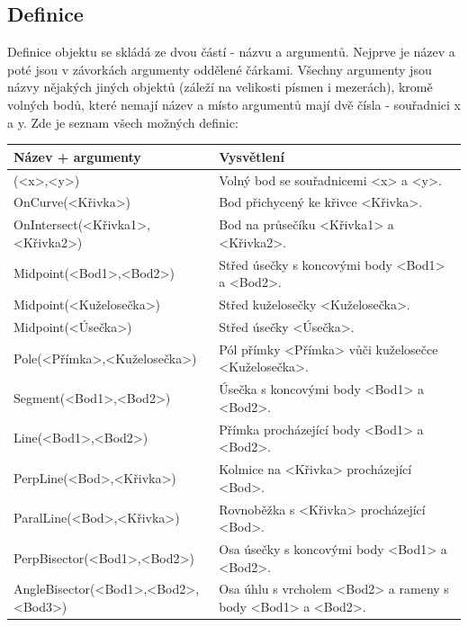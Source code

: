 \documentclass[11pt]{article}
\begin{document}
    \subsection{Definice}
    Definice objektu se skládá ze dvou částí - názvu a argumentů. Nejprve je název a poté jsou v závorkách argumenty oddělené čárkami. Všechny argumenty jsou názvy nějakých jiných objektů (záleží na velikosti písmen i mezerách), kromě volných bodů, které nemají název a místo argumentů mají dvě čísla - souřadnici x a y. Zde je seznam všech možných definic:
    \begin{center}
        \begin{tabularx}{\textwidth}{|l|X|}
            \hline
            \textbf{Název + argumenty} & \textbf{Vysvětlení} \\
            \hline
            (<x>,<y>) & Volný bod se souřadnicemi <x> a <y>. \\
            \hline
            OnCurve(<Křivka>) & Bod přichycený ke křivce <Křivka>. \\
            \hline
            OnIntersect(<Křivka1>,<Křivka2>) & Bod na průsečíku <Křivka1> a <Křivka2>. \\
            \hline
            Midpoint(<Bod1>,<Bod2>) & Střed úsečky s koncovými body <Bod1> a <Bod2>. \\
            \hline
            Midpoint(<Kuželosečka>) & Střed kuželosečky <Kuželosečka>. \\
            \hline
            Midpoint(<Úsečka>) & Střed úsečky <Úsečka>. \\
            \hline
            Pole(<Přímka>,<Kuželosečka>) & Pól přímky <Přímka> vůči kuželosečce <Kuželosečka>. \\
            \hline
            Segment(<Bod1>,<Bod2>) & Úsečka s koncovými body <Bod1> a <Bod2>. \\
            \hline
            Line(<Bod1>,<Bod2>) & Přímka procházející body <Bod1> a <Bod2>. \\
            \hline
            PerpLine(<Bod>,<Křivka>) & Kolmice na <Křivka> procházející <Bod>. \\
            \hline
            ParalLine(<Bod>,<Křivka>) & Rovnoběžka s <Křivka> procházející <Bod>. \\
            \hline
            PerpBisector(<Bod1>,<Bod2>) & Osa úsečky s koncovými body <Bod1> a <Bod2>. \\
            \hline
            AngleBisector(<Bod1>,<Bod2>,<Bod3>) & Osa úhlu s vrcholem <Bod2> a rameny s body <Bod1> a <Bod2>. \\

\end{tabularx}
\end{center}
\end{document}
